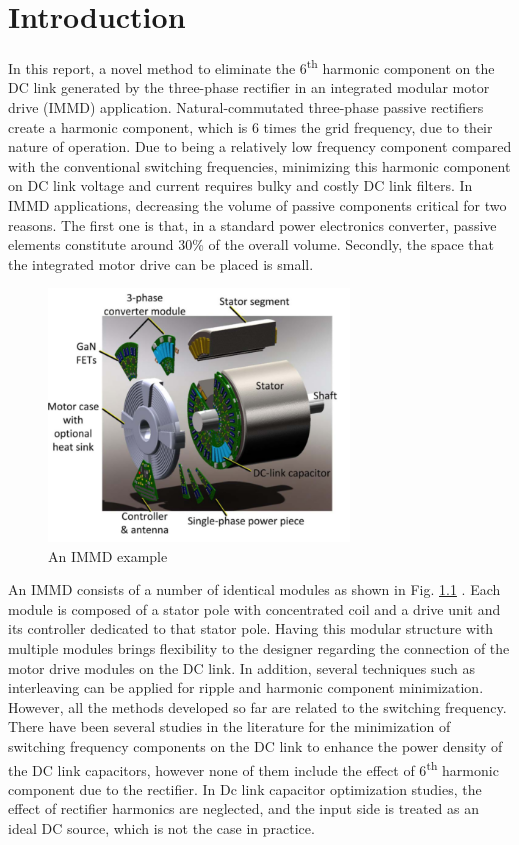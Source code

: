 \chapter{Introduction}
\label{chap:introduction}

In this report, a novel method to eliminate the 6\textsuperscript{th} harmonic component on the DC link generated by the three-phase rectifier in an integrated modular motor drive (IMMD) application. Natural-commutated three-phase passive rectifiers create a harmonic component, which is 6 times the grid frequency, due to their nature of operation. Due to being a relatively low frequency component compared with the conventional switching frequencies, minimizing this harmonic component on DC link voltage and current requires bulky and costly DC link filters. In IMMD applications, decreasing the volume of passive components critical for two reasons. The first one is that, in a standard power electronics converter, passive elements constitute around 30\% of the overall volume. Secondly, the space that the integrated motor drive can be placed is small.


\begin{figure}[htp]
  \centering
  \includegraphics[width=8cm]{images/immd_concept}
  \caption{An IMMD example \cite{Wang2014}}
  \label{fig:immd_concept}
\end{figure}

An IMMD consists of a number of identical modules as shown in Fig. \ref{fig:immd_concept} \cite{Wang2014}. Each module is composed of a stator pole with concentrated coil and a drive unit and its controller dedicated to that stator pole. Having this modular structure with multiple modules brings flexibility to the designer regarding the connection of the motor drive modules on the DC link. In addition, several techniques such as interleaving can be applied for ripple and harmonic component minimization. However, all the methods developed so far are related to the switching frequency. There have been several studies in the literature for the minimization of switching frequency components on the DC link to enhance the power density of the DC link capacitors, however none of them include the effect of 6\textsuperscript{th} harmonic component due to the rectifier. In Dc link capacitor optimization studies, the effect of rectifier harmonics are neglected, and the input side is treated as an ideal DC source, which is not the case in practice.

